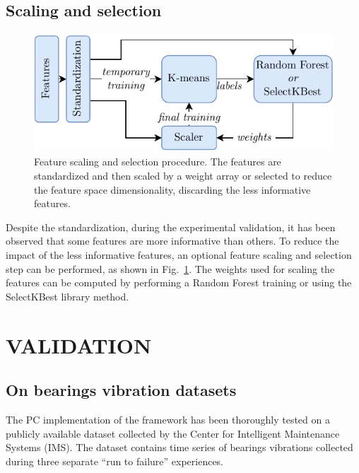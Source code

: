 \documentclass[a4paper, 10pt, conference, oneside]{ieeeconf}
\newcommand{\quoted}[1]{``#1''}
\begin{document}
\subsection{Scaling and selection}
\begin{figure}
    \includegraphics[width=\linewidth]{images/Feat_scaling.pdf}
    \caption{Feature scaling and selection procedure. The features are standardized and then scaled by a weight array or selected to reduce the feature space dimensionality, discarding the less informative features.}
    \label{fig:feature_scaling}
\end{figure}
Despite the standardization, during the experimental validation, it has been observed that some features are more informative than others. To reduce the impact of the less informative features, an optional feature scaling and selection step can be performed, as shown in Fig.~\ref{fig:feature_scaling}. The weights used for scaling the features can be computed by performing a Random Forest training or using the SelectKBest library method. \section{VALIDATION}
\label{sec:validation}

\subsection{On bearings vibration datasets}

The PC implementation of the framework has been thoroughly tested on a publicly available dataset collected by the Center for Intelligent Maintenance Systems (IMS).
The dataset contains time series of bearings vibrations collected during three separate \quoted{run to failure} experiences. 
\end{document}
